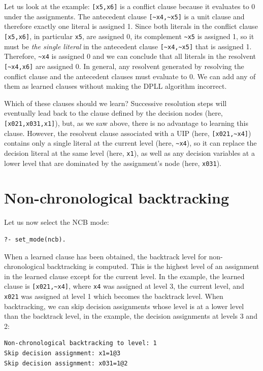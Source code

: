 \documentclass[11pt]{article}
\newcommand*{\p}[1]{\textup{\texttt{#1}}}
\begin{document}
Let us look at the example: \verb+[x5,x6]+ is a conflict clause because
it evaluates to 0 under the assignments. The antecedent clause
\verb+[~x4,~x5]+ is a unit clause and therefore exactly one literal is
assigned 1. Since both literals in the conflict clause \verb+[x5,x6]+,
in particular \verb+x5+, are assigned 0, its complement \verb+~x5+ is
assigned 1, so it must be \emph{the single literal} in the antecedent
clause \verb+[~x4,~x5]+ that is assigned 1. Therefore, \verb+~x4+ is
assigned 0 and we can conclude that all literals in the resolvent
\verb+[~x4,x6]+ are assigned 0. In general, any resolvent generated by
resolving the conflict clause and the antecedent clauses must evaluate
to 0. We can add any of them as learned clauses without making the DPLL
algorithm incorrect.

Which of these clauses should we learn? Successive resolution steps will
eventually lead back to the clause defined by the decision nodes (here,
\verb+[x021,x031,x1]+), but, as we saw above, there is no advantage to
learning this clause. However, the resolvent clause associated with a
UIP (here, \verb+[x021,~x4]+) contains only a single literal at the
current level (here, \verb+~x4+), so it can replace the decision literal
at the same level (here, \verb+x1+), as well as any decision variables
at a lower level that are dominated by the assignment's node (here,
\verb+x031+).


\clearpage

\section{Non-chronological backtracking}

Let us now select the NCB mode:
\begin{verbatim}
?- set_mode(ncb).
\end{verbatim}

When a learned clause has been obtained, the backtrack level for
non-chronological backtracking is computed. This is the highest level of
an assignment in the learned clause except for the current level. In the
example, the learned clause is \verb+[x021,~x4]+, where \p{x4} was
assigned at level 3, the current level, and \p{x021} was assigned at
level 1 which becomes the backtrack level. When backtracking, we can
skip decision assignments whose level is at a lower level than the
backtrack level, in the example, the decision assignments at levels 3
and 2:

\begin{verbatim}
Non-chronological backtracking to level: 1
Skip decision assignment: x1=1@3
Skip decision assignment: x031=1@2
\end{verbatim}
\end{document}

